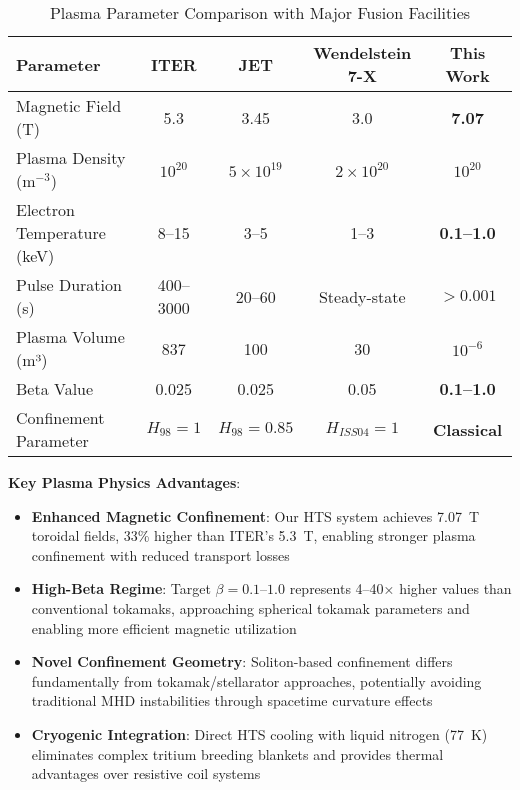 \documentclass[10pt,twocolumn]{article}
\begin{document}
\begin{table}[htbp]
\centering
\caption{Plasma Parameter Comparison with Major Fusion Facilities}
\label{tab:fusion_comparison}
\begin{tabular}{@{}lcccc@{}}
\toprule
Parameter & ITER & JET & Wendelstein 7-X & \textbf{This Work} \\
\midrule
Magnetic Field (T) & 5.3 & 3.45 & 3.0 & \textbf{7.07} \\
Plasma Density (m$^{-3}$) & $10^{20}$ & $5 \times 10^{19}$ & $2 \times 10^{20}$ & \textbf{$10^{20}$} \\
Electron Temperature (keV) & 8--15 & 3--5 & 1--3 & \textbf{0.1--1.0} \\
Pulse Duration (s) & 400--3000 & 20--60 & Steady-state & \textbf{$>0.001$} \\
Plasma Volume (m³) & 837 & 100 & 30 & \textbf{$10^{-6}$} \\
Beta Value & 0.025 & 0.025 & 0.05 & \textbf{0.1--1.0} \\
Confinement Parameter & $H_{98} = 1$ & $H_{98} = 0.85$ & $H_{ISS04} = 1$ & \textbf{Classical} \\
\bottomrule
\end{tabular}
\end{table}

\textbf{Key Plasma Physics Advantages}:
\begin{itemize}
\item \textbf{Enhanced Magnetic Confinement}: Our HTS system achieves 7.07~T toroidal fields, 33\% higher than ITER's 5.3~T, enabling stronger plasma confinement with reduced transport losses
\item \textbf{High-Beta Regime}: Target $\beta = 0.1$--$1.0$ represents 4--40× higher values than conventional tokamaks, approaching spherical tokamak parameters and enabling more efficient magnetic utilization
\item \textbf{Novel Confinement Geometry}: Soliton-based confinement differs fundamentally from tokamak/stellarator approaches, potentially avoiding traditional MHD instabilities through spacetime curvature effects
\item \textbf{Cryogenic Integration}: Direct HTS cooling with liquid nitrogen (77~K) eliminates complex tritium breeding blankets and provides thermal advantages over resistive coil systems
\end{itemize}
\end{document}
